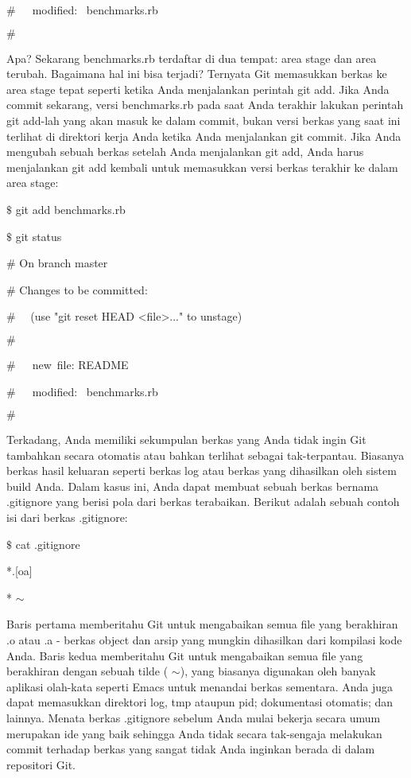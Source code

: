 \noindent 
 $  \#  $~~~modified:~  benchmarks.rb \par
\noindent 
 $  \#  $ \par
\vspace{12pt}
\noindent 
Apa? Sekarang benchmarks.rb terdaftar di dua tempat: area stage dan area terubah. Bagaimana hal ini bisa terjadi? Ternyata Git memasukkan berkas ke area stage tepat seperti ketika Anda menjalankan perintah git add. Jika Anda commit sekarang, versi benchmarks.rb pada saat Anda terakhir lakukan perintah git add-lah yang akan masuk ke dalam commit, bukan versi berkas yang saat ini terlihat di direktori kerja Anda ketika Anda menjalankan git commit. Jika Anda mengubah sebuah berkas setelah Anda menjalankan git add, Anda harus menjalankan git add kembali untuk memasukkan versi berkas terakhir ke dalam area stage: \par
\vspace{12pt}
\vspace{12pt}
\noindent 
 $  \$  $ git add benchmarks.rb \par
\noindent 
 $  \$  $ git status \par
\noindent 
 $  \#  $ On branch master \par
\noindent 
 $  \#  $ Changes to be committed: \par
\noindent 
 $  \#  $~~ (use "git reset HEAD <file>..." to unstage) \par
\noindent 
 $  \#  $ \par
\noindent 
 $  \#  $~~~new~file:   README \par
\noindent 
 $  \#  $~~~modified:~  benchmarks.rb \par
\noindent 
 $  \#  $ \par
\vspace{12pt}
\vspace{12pt}
\noindent 
Terkadang, Anda memiliki sekumpulan berkas yang Anda tidak ingin Git tambahkan secara otomatis atau bahkan terlihat sebagai tak-terpantau. Biasanya berkas hasil keluaran seperti berkas log atau berkas yang dihasilkan oleh sistem build Anda. Dalam kasus ini, Anda dapat membuat sebuah berkas bernama .gitignore yang berisi pola dari berkas terabaikan. Berikut adalah sebuah contoh isi dari berkas .gitignore: \par
\noindent 
 $  \$  $ cat .gitignore \par
\noindent 
*.[oa] \par
\noindent 
* $  \sim  $ \par
\noindent 
Baris pertama memberitahu Git untuk mengabaikan semua file yang berakhiran .o atau .a - berkas object dan arsip yang mungkin dihasilkan dari kompilasi kode Anda. Baris kedua memberitahu Git untuk mengabaikan semua file yang berakhiran dengan sebuah tilde ( $  \sim  $), yang biasanya digunakan oleh banyak aplikasi olah-kata seperti Emacs untuk menandai berkas sementara. Anda juga dapat memasukkan direktori log, tmp ataupun pid; dokumentasi otomatis; dan lainnya. Menata berkas .gitignore sebelum Anda mulai bekerja secara umum merupakan ide yang baik sehingga Anda tidak secara tak-sengaja melakukan commit terhadap berkas yang sangat tidak Anda inginkan berada di dalam repositori Git. \par
